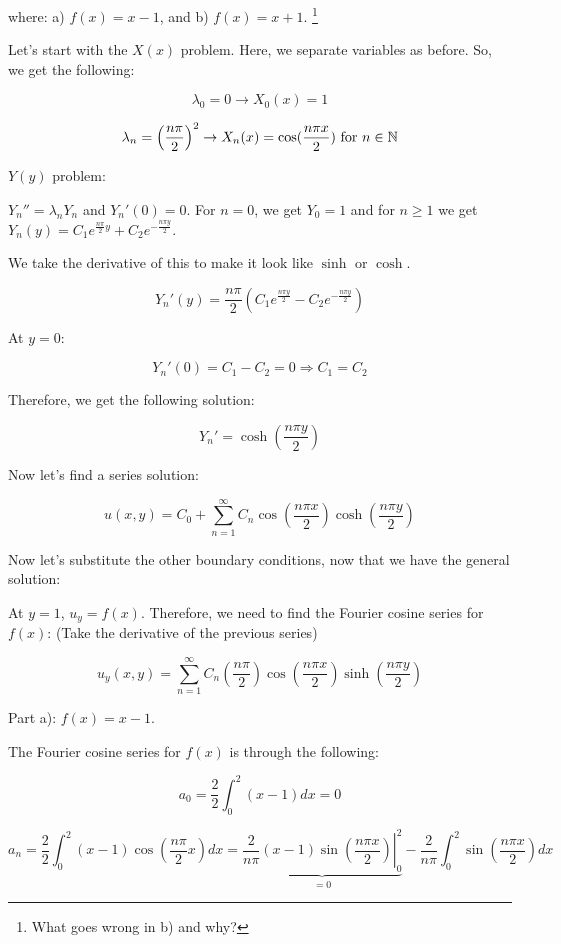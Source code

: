 \documentclass{article}
\begin{document}
where: a) $f(x) = x-1$, and b) $f(x) = x+1$. \footnote{What goes wrong in b) and why?}

Let's start with the $X(x)$ problem. Here, we separate variables as before. So, we get the following:

$$\lambda_0 = 0 \to X_0(x) = 1$$

$$\lambda_n = \left( \frac{n \pi}{2} \right)^2 \to X_n (x) = \cos ( \frac{n \pi x}{2} ) \text{ for } n \in \mathbb{N}$$

$Y(y)$ problem:

$Y_n'' = \lambda_n Y_n$ and $Y_n '(0) = 0$. For $n = 0$, we get $Y_0 = 1$ and for $n \geq 1$ we get $Y_n (y) = C_1 e^{\frac{n \pi}{2} y } + C_2 e^{ - \frac{n \pi y}{2}}$. 

We take the derivative of this to make it look like $\sinh$ or $\cosh$. 

$$Y_n'(y) = \frac{n \pi}{2} \left( C_1 e^{ \frac{n \pi y}{2}} - C_2 e^{- \frac{n \pi y}{2}} \right)$$

At $y = 0$:

$$Y_n'(0) = C_1 - C_2 = 0 \Rightarrow C_1 = C_2$$

Therefore, we get the following solution:

$$Y_n' = \cosh \left( \frac{n \pi y}{2} \right)$$

Now let's find a series solution:

$$u(x,y) = C_0 + \sum_{n=1}^\infty C_n \cos \left( \frac{n \pi x}{2} \right) \cosh \left( \frac{n \pi y}{2} \right)$$

Now let's substitute the other boundary conditions, now that we have the general solution:

At $y = 1$, $u_y = f(x)$. Therefore, we need to find the Fourier cosine series for $f(x)$: (Take the derivative of the previous series)

$$u_y (x,y) = \sum_{n=1}^\infty C_n \left( \frac{n \pi}{2} \right) \cos \left( \frac{n \pi x}{2} \right) \sinh \left( \frac{n \pi y}{2} \right)$$

Part a): $f(x) = x-1$. 

The Fourier cosine series for $f(x)$ is through the following:

$$a_0 = \frac{2}{2} \int_0^2 (x-1) dx = 0$$

$$a_n = \frac{2}{2} \int_0^2 (x-1) \cos \left( \frac{n \pi}{2} x \right) dx = \underbrace{\left. \frac{2}{n\pi} (x-1) \sin \left( \frac{n \pi x}{2} \right) \right|_0^2}_{ = 0} - \frac{2}{n \pi} \int_0^2 \sin \left( \frac{n \pi x}{2} \right) dx$$
\end{document}
